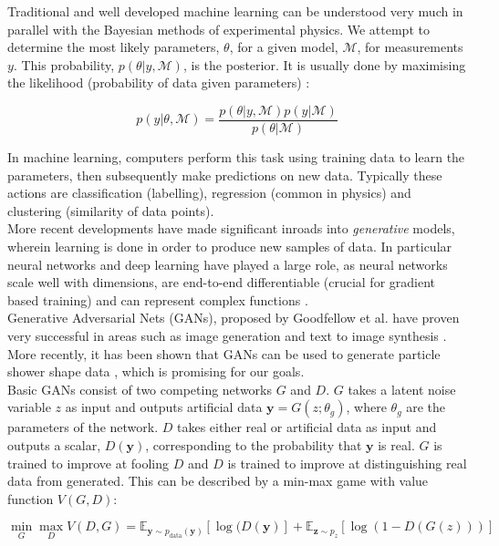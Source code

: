 \documentclass{article}
\begin{document}
Traditional and well developed machine learning can be understood very much in parallel with the Bayesian methods of experimental physics. We attempt to determine the most likely parameters, $\theta$, for a given model, $\mathcal{M}$, for measurements $y$. This probability, $p(\theta|y, \mathcal{M})$, is the posterior. It is usually done by maximising the likelihood (probability of data given parameters) \cite{data}:

\[
p(y|\theta, \mathcal{M}) = \frac{p(\theta|y, \mathcal{M})p(y|\mathcal{M})}{p(\theta|\mathcal{M})}
\]

In machine learning, computers perform this task using training data to learn the parameters, then subsequently make predictions on new data. Typically these actions are classification (labelling), regression (common in physics) and clustering (similarity of data points). \\

More recent developments have made significant inroads into \textit{generative} models, wherein learning is done in order to produce new samples of data. In particular neural networks and deep learning have played a large role, as neural networks scale well with dimensions, are end-to-end differentiable (crucial for gradient based training) and can represent complex functions \cite{deepgen}.\\

Generative Adversarial Nets (GANs), proposed by Goodfellow et al. \cite{gan1} have proven very successful in areas such as image generation and text to image synthesis \cites{radford}{text2im}. More recently, it has been shown that GANs can be used to generate particle shower shape data \cite{louppe}, which is promising for our goals. \\

Basic GANs consist of two competing networks $G$ and $D$. $G$ takes a latent noise variable $z$ as input and outputs artificial data $\mathbf{y} = G(z;\theta_g)$, where $\theta_g$ are the parameters of the network. $D$ takes either real or artificial data as input and outputs a scalar, $D(\mathbf{y})$, corresponding to the probability that $\mathbf{y}$ is real. $G$ is trained to improve at fooling $D$ and $D$ is trained to improve at distinguishing real data from generated. This can be described by a min-max game with value function $V(G,D)$:

\begin{equation}
	\label{eq:minmax}
	\min_{G}\max_{D}V(D,G) = \mathbb{E}_{\mathbf{y}\sim p_{\text{data}}(\mathbf{y})} [\log(D(\mathbf{y})] + \mathbb{E}_{\mathbf{z}\sim p_{z}} [\log(1-D(G(z)))] 
\end{equation} 
\end{document}
